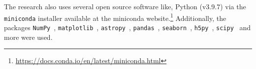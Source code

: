 \documentclass[twocolumn, twocolappendix]{aastex63}
\begin{document}
    The research also uses several open source software like, Python (v3.9.7) via the \texttt{miniconda} installer available at the miniconda website.\footnote{\url{https://docs.conda.io/en/latest/miniconda.html}}
    Additionally, the packages \texttt{NumPy}~\citep{Numpy2020}, \texttt{matplotlib}~\citep{Matplotlib2005, Matplotlib2007}, \texttt{astropy}~\citep{Astropy2013}, \texttt{pandas}~\citep{Pandas2021}, \texttt{seaborn}~\citep{Seaborn2021}, \texttt{h5py}~\citep{H5py2018, H5py2021}, \texttt{scipy}~\citep{Scipy2020} and more were used.


    \clearpage
    \appendix
    
    
    
    

    \clearpage
    \newpage
    {}
    
\end{document}
